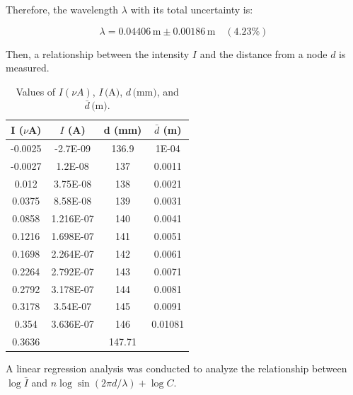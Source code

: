 \documentclass{article}
\begin{document}
Therefore, the wavelength \( \lambda \) with its total uncertainty is:

\[
\lambda = 0.04406 \, \text{m} \pm 0.00186 \, \text{m} \quad (4.23\%)
\]

Then, a relationship between the intensity $I$ and the distance from a node $d$ is measured. 

\begin{table}[H]
    \centering
    \begin{tabular}{|c|c|c|c|}
        \hline
        I ($\nu$A) & \( I \) (A) & d (mm) & \( \bar{d} \) (m) \\
        \hline
        -0.0025 & -2.7E-09 & 136.9 & 1E-04 \\
        -0.0027 & 1.2E-08 & 137 & 0.0011 \\
        0.012 & 3.75E-08 & 138 & 0.0021 \\
        0.0375 & 8.58E-08 & 139 & 0.0031 \\
        0.0858 & 1.216E-07 & 140 & 0.0041 \\
        0.1216 & 1.698E-07 & 141 & 0.0051 \\
        0.1698 & 2.264E-07 & 142 & 0.0061 \\
        0.2264 & 2.792E-07 & 143 & 0.0071 \\
        0.2792 & 3.178E-07 & 144 & 0.0081 \\
        0.3178 & 3.54E-07 & 145 & 0.0091 \\
        0.354 & 3.636E-07 & 146 & 0.01081 \\
        0.3636 & & 147.71 & \\
        \hline
    \end{tabular}
    \caption{Values of \( I (\nu A) \), \( I \, \text{(A)} \), \( d \, \text{(mm)} \), and \( \bar{d} \, \text{(m)} \).}
\end{table}


A linear regression analysis was conducted to analyze the relationship between $\log \bar{I}$ and $n \log \sin\left(2 \pi d / \lambda \right) + \log C$. 
\end{document}
